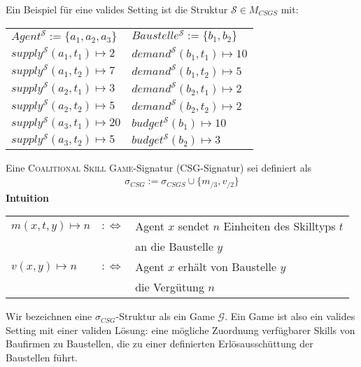 \begin{bsp}[]
  Ein Beispiel für eine valides Setting ist die Struktur $\mathcal{S}\in M_{CSGS}$ mit:\\

  \setlength{\tabcolsep}{24pt}
  \begin{tabular}{l|l}
    $Agent^\mathcal{S} := \{a_1, a_2, a_3\}$ & $Baustelle^\mathcal{S} := \{b_1, b_2\}$ \\
    $supply^\mathcal{S}(a_1, t_1)\mapsto 2 $ & $demand^\mathcal{S}(b_1, t_1)\mapsto 10$\\
    $supply^\mathcal{S}(a_1, t_2)\mapsto 7 $ & $demand^\mathcal{S}(b_1, t_2)\mapsto 5 $\\
    $supply^\mathcal{S}(a_2, t_1)\mapsto 3 $ & $demand^\mathcal{S}(b_2, t_1)\mapsto 2 $\\
    $supply^\mathcal{S}(a_2, t_2)\mapsto 5 $ & $demand^\mathcal{S}(b_2, t_2)\mapsto 2 $\\
    $supply^\mathcal{S}(a_3, t_1)\mapsto 20$ & $budget^\mathcal{S}(b_1)\mapsto 10$\\
    $supply^\mathcal{S}(a_3, t_2)\mapsto 5 $ & $budget^\mathcal{S}(b_2)\mapsto 3 $\\
  \end{tabular}
\end{bsp}

\begin{definition}[CSG]
  Eine \textsc{Coalitional Skill Game}-Signatur (CSG-Signatur) sei definiert als
  \begin{align*}
    \sigma_{CSG}:=\sigma_{CSGS}\cup\{m_{/3}, v_{/2}\}
  \end{align*}
  \textbf{Intuition} \\
    \begin{tabular}{lrl}
    $m(x, t, y)\mapsto n$&$:\Leftrightarrow$& Agent $x$ sendet $n$ Einheiten des Skilltyps $t$ \\&& an die Baustelle $y$ \\
    $v(x,y)\mapsto n$&$:\Leftrightarrow$& Agent $x$ erhält von Baustelle $y$ \\&& die Vergütung $n$
    \end{tabular}
\end{definition}

Wir bezeichnen eine $\sigma_{CSG}$-Struktur als ein Game $\mathcal{G}$. Ein Game ist also ein valides Setting mit einer validen Lösung: eine mögliche Zuordnung verfügbarer Skills von Baufirmen zu Baustellen, die zu einer definierten Erlösausschüttung der Baustellen führt.

